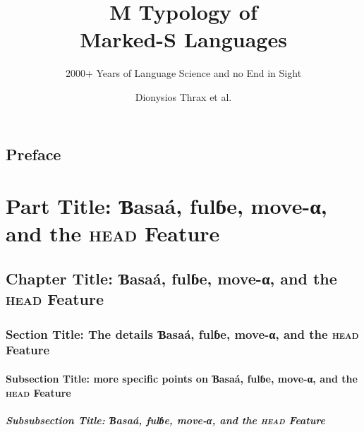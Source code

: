 \documentclass[ number=??
			   ,series=sidl
			   ,isbn=xxx-x-xxxxxx-xx-x
			   ,output=long   %
			   ,draftmode   
			  ]{LSP/langsci}
\title{M Typology of \\ Marked-S Languages}
\subtitle{2000+ Years of Language Science and no End in Sight}
\author{Dionysios Thrax \newlineCover et al.}
\begin{document}
 
             
                                                                                    
                                     
\maketitle  
 
\frontmatter 

\chapter*{Preface}

\lipsum[3-10]  	            
     
\tableofcontents    

\part{Part Title: Ɓasaá, fulɓe, move-α, and the \textrm{\textsc{head}} Feature}	               
\chapter{Chapter Title: Ɓasaá, fulɓe, move-α, and the \textrm{\textsc{head}} Feature}
\section{Section Title: The details Ɓasaá, fulɓe, move-α, and the \textrm{\textsc{head}} Feature}
\subsection{Subsection Title: more specific points on Ɓasaá, fulɓe, move-α, and the \textrm{\textsc{head}} Feature}
\subsubsection{Subsubsection Title: Ɓasaá, fulɓe, move-α, and the \textrm{\textsc{head}} Feature}       
   
                                                           
\lipsum 
\lipsum[3-10]  
\end{document}

